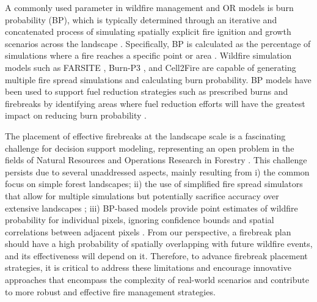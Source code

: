 \documentclass[a4paper,fleqn]{cas-sc}
\begin{document}
A commonly used parameter in wildfire management and OR models is burn probability (BP), which is typically determined through an iterative and concatenated process of simulating spatially explicit fire ignition and growth scenarios across the landscape \citep{parisien2005mapping,finney2005challenge}. Specifically, BP is calculated as the percentage of simulations where a fire reaches a specific point or area \citep{parisien2005mapping}. Wildfire simulation models such as FARSITE \citep{finney1998farsite}, Burn-P3 \citep{parisien2005mapping}, and Cell2Fire \citep{pais2021cell2fire} are capable of generating multiple fire spread simulations and calculating burn probability. BP models have been used to support fuel reduction strategies such as prescribed burns and firebreaks by identifying areas where fuel reduction efforts will have the greatest impact on reducing burn probability \citep{carrasco2023firebreak,ager2010comparison,oliveira2016assessing}.

The placement of effective firebreaks at the landscape scale is a fascinating challenge for decision support modeling, representing an open problem in the fields of Natural Resources and Operations Research in Forestry \citep{martell2007forest,ronnqvist2015operations}. This challenge persists due to several unaddressed aspects, mainly resulting from i) the common focus on simple forest landscapes; ii) the use of simplified fire spread simulators that allow for multiple simulations but potentially sacrifice accuracy over extensive landscapes \citep{bettinger2009,kim2009spatial,konoshima2008spatial,gonzalez2011integrating}; iii) BP-based models provide point estimates of wildfire probability for individual pixels, ignoring confidence bounds and spatial correlations between adjacent pixels \citep{kuhlmann2015generating}. From our perspective, a firebreak plan should have a high probability of spatially overlapping with future wildfire events, and its effectiveness will depend on it. Therefore, to advance firebreak placement strategies, it is critical to address these limitations and encourage innovative approaches that encompass the complexity of real-world scenarios and contribute to more robust and effective fire management strategies. 
\end{document}
